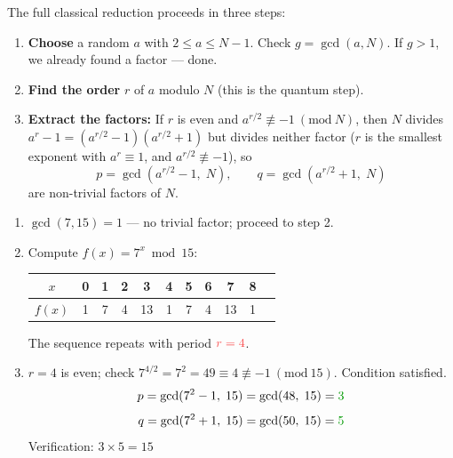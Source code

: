 \documentclass[a4paper,11pt]{article}
\newcommand{\crd}[1]{\textcolor{ibmred}{#1}}
\newcommand{\cblu}[1]{\textcolor{ibmblue}{#1}}
\newcommand{\cgr}[1]{\textcolor{codegreen}{#1}}
\newcommand{\Mod}[1]{\ (\mathrm{mod}\ #1)}
\begin{document}
\vspace{0.4cm}
\noindent The full classical reduction proceeds in three steps:

\begin{enumerate}
    \item \textbf{Choose} a random $a$ with $2 \leq a \leq N-1$.
    Check $g = \gcd(a, N)$. If $g > 1$, we already found a factor — done.

    \item \textbf{Find the order} $r$ of $a$ modulo $N$
    (this is the quantum step).

    \item \textbf{Extract the factors:} If $r$ is even and
    $a^{r/2} \not\equiv -1 \Mod{N}$, then $N$ divides
    $a^r - 1 = (a^{r/2}-1)(a^{r/2}+1)$ but divides neither factor ($r$ is the
    smallest exponent with $a^r \equiv 1$, and $a^{r/2} \not\equiv -1$), so
    \[
        p = \gcd\!\left(a^{r/2} - 1,\; N\right), \qquad
        q = \gcd\!\left(a^{r/2} + 1,\; N\right)
    \]
    are non-trivial factors of $N$.
\end{enumerate}

\begin{mathbox}[Classical Reduction: $N=15$, $a=7$]
\begin{enumerate}
    \item $\gcd(7, 15) = 1$ — no trivial factor; proceed to step 2.

    \item Compute $f(x) = 7^x \bmod 15$:
    \begin{center}
    \begin{tabular}{c|cccccccccc}
        $x$    & 0 & 1 & 2 & 3  & 4 & 5 & 6 & 7  & 8 \\ \hline
        $f(x)$ & \cblu{1} & 7 & 4 & 13 & \cblu{1} & 7 & 4 & 13 & \cblu{1}
    \end{tabular}
    \end{center}
    The sequence repeats with period $\crd{r = 4}$.

    \item $r=4$ is even; check $7^{4/2} = 7^2 = 49 \equiv 4 \not\equiv -1 \Mod{15}$.
    Condition satisfied.
    \[
        p = \gcd(7^2 - 1,\; 15) = \gcd(48,\; 15) = \cgr{3}
    \]
    \[
        q = \gcd(7^2 + 1,\; 15) = \gcd(50,\; 15) = \cgr{5}
    \]
    Verification: $3 \times 5 = 15$ \checkmark
\end{enumerate}
\end{mathbox}

\end{document}

